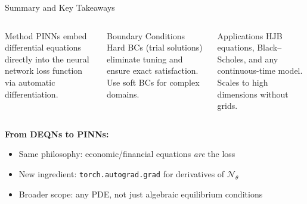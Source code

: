 \documentclass[aspectratio=169,11pt]{beamer}
\newcommand{\emphc}[1]{\textcolor{harvardcrimson}{#1}}
\begin{document}
\begin{frame}{Summary and Key Takeaways}
\begin{columns}[T]
\begin{block}{Method}
\centering\small
\vspace{0.2em}
PINNs embed \emphc{differential equations} directly into the neural network loss function via \emphc{automatic differentiation}.
\vspace{0.2em}
\end{block}

\begin{block}{Boundary Conditions}
\centering\small
\vspace{0.2em}
\emphc{Hard BCs} (trial solutions) eliminate tuning and ensure exact satisfaction. Use \emphc{soft BCs} for complex domains.
\vspace{0.2em}
\end{block}

\begin{block}{Applications}
\centering\small
\vspace{0.2em}
HJB equations, Black--Scholes, and any continuous-time model. Scales to \emphc{high dimensions} without grids.
\vspace{0.2em}
\end{block}
\end{columns}

\vspace{0.6em}
\textbf{From DEQNs to PINNs:}
\begin{itemize}
    \item \emphc{Same philosophy:} economic/financial equations \emph{are} the loss
    \item \emphc{New ingredient:} \texttt{torch.autograd.grad} for derivatives of $\mathcal{N}_\theta$
    \item \emphc{Broader scope:} any PDE, not just algebraic equilibrium conditions
\end{itemize}
\end{frame}
\end{document}
